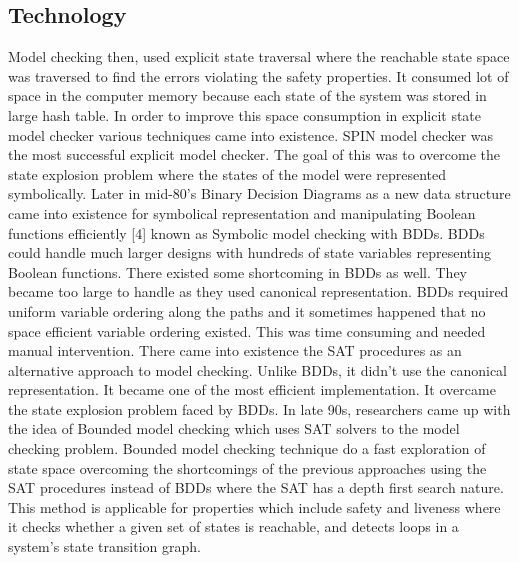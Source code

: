 \documentclass[a4paper,12pt]{extarticle}
\begin{document}
\subsection{Technology}
\label{tech}
Model checking then, used explicit state traversal where the reachable state space was traversed to find the errors violating the safety properties. It consumed lot of space in the computer memory because each state of the system was stored in large hash table. In order to improve this space consumption in explicit state model checker various techniques came into existence. SPIN model checker was the most successful explicit model checker. The goal of this was to overcome the state explosion problem where the states of the model were represented symbolically.
Later in mid-80's Binary Decision Diagrams as a new data structure came into existence for symbolical representation and manipulating Boolean functions efficiently [4] known as Symbolic model checking with BDDs. BDDs could handle much larger designs with hundreds of state variables representing Boolean functions. There existed some shortcoming in BDDs as well. They became too large to handle as they used canonical representation. BDDs required uniform variable ordering along the paths and it sometimes happened that no space efficient variable ordering existed. This was time consuming and needed manual intervention.
There came into existence the SAT procedures as an alternative approach to model checking. Unlike BDDs, it didn’t use the canonical representation. It became one of the most efficient implementation. It overcame the state explosion problem faced by BDDs.
In late 90s, researchers came up with the idea of Bounded model checking which uses SAT solvers to the model checking problem. Bounded model checking technique do a fast exploration of state space overcoming the shortcomings of the previous approaches using the SAT procedures instead of BDDs where the SAT has a depth first search nature. This method is applicable for properties which include safety and liveness where it checks whether a given set of states is reachable, and detects loops in a system’s state transition graph.
\end{document}
